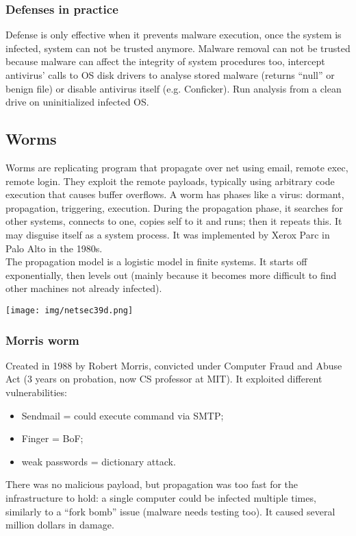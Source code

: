 \documentclass[a4paper, 10pt, titlepage]{article}
\begin{document}
\subsubsection*{Defenses in practice}
 Defense is only effective when it prevents malware execution, once the system is infected, system can not be trusted anymore. Malware removal can not be trusted because malware can affect the integrity of system procedures too, intercept antivirus’ calls to OS disk drivers to analyse stored malware (returns “null” or benign file) or disable antivirus itself (e.g. Conficker).
 Run analysis from a clean drive on uninitialized infected OS.
 
 
 \subsection{Worms}
Worms are replicating program that propagate over net using email, remote exec, remote login. They exploit the remote payloads, typically using arbitrary code execution that causes buffer overflows.
A worm has phases like a virus: dormant, propagation, triggering, execution. During the propagation phase, it searches for other systems, connects to one, copies self to it and runs; then it repeats this. It may disguise itself as a system process. It was implemented by Xerox Parc in Palo Alto in the 1980s.\medskip\\
The propagation model is a logistic model in finite systems. It starts off exponentially, then levels out (mainly because it becomes more difficult to find other machines not already infected).
\begin{center}
	\texttt{[image: img/netsec39d.png]}
\end{center}

\subsubsection{Morris worm}
Created in 1988 by Robert Morris, convicted under Computer Fraud and Abuse Act (3 years on probation, now CS professor at MIT). 
It exploited different vulnerabilities:
\begin{itemize}
	\item Sendmail = could execute command via SMTP;
	\item Finger = BoF;
	\item weak passwords = dictionary attack.
\end{itemize}
There was no malicious payload, but propagation was too fast for the infrastructure to hold: a single computer could be infected multiple times, similarly to a “fork bomb” issue (malware needs testing too). It caused several million dollars in damage.
\end{document}
